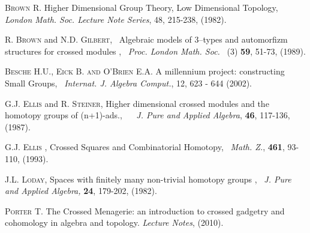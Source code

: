 \documentclass[a4paper,11pt]{article}
\theoremstyle{plain}
\theoremstyle{definition}
\begin{document}
\begin{thebibliography}{99}
	 \textsc{Brown R.} Higher Dimensional Group Theory, Low
	Dimensional Topology, \emph{London Math. Soc. Lecture Note Series}, 48,
	215-238, (1982).
	
	
	 \textsc{R. Brown} and \textsc{N.D. Gilbert}, \textrm{\
		Algebraic models of 3--types and automorfizm structures for crossed modules}
	, \ \emph{Proc. London Math. Soc.} \ (3) \textbf{59}, 51-73, (1989).
	
	 \textsc{Besche H.U., Eick B. and O'Brien E.A.} A
	millennium project: constructing Small Groups, \emph{\ Internat. J. Algebra
		Comput.}, 12, 623 - 644 (2002).
	
	
	
	
	
	 \textsc{G.J. Ellis } and \textsc{R. Steiner}, \textrm{Higher
		dimensional crossed modules and the homotopy groups of (n+1)-ads.}, \ \emph{%
		\ J. Pure and Applied Algebra}, \textbf{46}, 117-136, (1987).
	
	 \textsc{G.J. Ellis }, \textrm{Crossed Squares and
		Combinatorial Homotopy}, \ \emph{Math. Z.}, \textbf{461}, 93-110, (1993).
	
	 \textsc{J.L. Loday}, \textrm{Spaces with finitely many
		non-trivial homotopy groups }, \ \emph{J. Pure and Applied Algebra, }
	\textbf{24}, 179-202, (1982).
	
	 \textsc{Porter T.} The Crossed Menagerie: an introduction
	to crossed gadgetry and cohomology in algebra and topology. \emph{Lecture
		Notes}, (2010).
	

\end{thebibliography}
\end{document}
